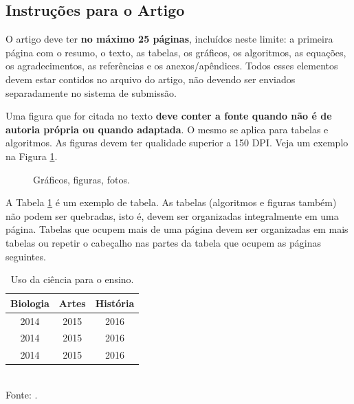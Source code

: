\documentclass[a4paper,11pt,fleqn]{article}
\begin{document}
\subsection{Instruções para o Artigo}

O artigo deve ter \textbf{no máximo 25 páginas}, incluídos neste limite: a primeira página com o resumo, o texto, as tabelas, os gráficos, os algoritmos, as equações, os agradecimentos, as referências e os anexos/apêndices. Todos esses elementos devem estar contidos no arquivo do artigo, não devendo ser enviados separadamente no sistema de submissão. 

Uma figura que for citada no texto \textbf{deve conter a fonte quando não é de autoria própria ou quando adaptada}. O mesmo se aplica para tabelas e algoritmos. As figuras devem ter qualidade superior a 150 DPI. Veja um exemplo na Figura \ref{fig1}. 

\begin{figure}[h!]
\centering
\caption{Gráficos, figuras, fotos. \label{fig1}}
\end{figure}

A Tabela \ref{tab1} é um exemplo de tabela. As tabelas (algoritmos e figuras também) não podem ser quebradas, isto é, devem ser organizadas integralmente em uma página. Tabelas que ocupem mais de uma página devem ser organizadas em mais tabelas ou repetir o cabeçalho nas partes da tabela que ocupem as páginas seguintes.

\begin{table}[h!]
\centering
\caption{Uso da ciência para o ensino. \label{tab1}}
\begin{tabular}{|c|c|c|} \hline
\textbf{Biologia} & \textbf{Artes} & \textbf{História} \\ \hline
2014 & 2015 & 2016 \\ \hline
2014 & 2015 & 2016 \\ \hline
2014 & 2015 & 2016 \\ \hline
\end{tabular}
{\\ Fonte: \citet{Doe2012}.}
\end{table}
\end{document}
